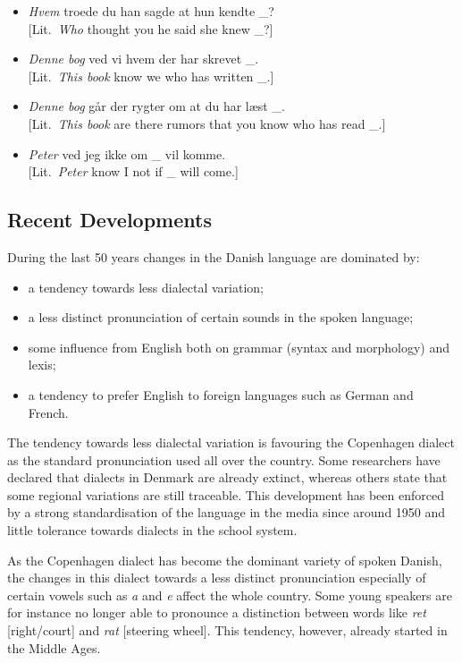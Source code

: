 \begin{multicols}{2}
\begin{itemize}    
\item {\it Hvem} troede du han sagde at hun kendte \_? \\
{[}Lit.\ {\it Who} thought you he said she knew \_?{]}
\item {\it Denne bog} ved vi hvem der har skrevet \_.\\
{[}Lit.\ {\it This book} know we who has written \_.{]}
\item {\it Denne bog} g\aa r der rygter om at du har l\ae st \_.\\
{[}Lit.\ {\it This book} are there rumors that you know who has read \_.{]}
\item {\it Peter} ved jeg ikke om \_ vil komme.\\
{[}Lit.\ {\it Peter} know I not if \_ will come.{]}
\end{itemize}
 

\subsection{Recent Developments}

During the last 50 years changes in the Danish language are dominated by: 
\begin{itemize}
\item	a tendency towards less dialectal variation;
\item	a less distinct pronunciation of certain sounds in the spoken language;
\item	some influence from English both on grammar (syntax and morphology) and lexis; 
\item	a tendency to prefer English to foreign languages such as German and French. 
\end{itemize}
The tendency towards less dialectal variation is favouring the Copenhagen dialect as the standard pronunciation used all over the country. Some researchers have declared that dialects in Denmark are already extinct, whereas others state that some regional variations are still traceable. This development has been enforced by a strong standardisation of the language in the media since around 1950 and little tolerance towards dialects in the school system. 

As the Copenhagen dialect has become the dominant variety of spoken Danish, the changes in this dialect towards a less distinct pronunciation especially of certain vowels such as {\it a} and {\it e} affect the whole country. Some young speakers are for instance no longer able to pronounce a distinction between words like {\it ret} [right/court]  and {\it rat} [steering wheel]. This tendency, however, already started in the Middle Ages. 


\end{multicols}
